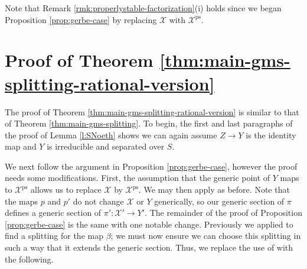 \documentclass{amsart}
\theoremstyle{definition}
\newcommand{\cX}{\mathcal{X}}
\DeclareMathOperator{\ps}{ps}
\begin{document}
	Note that Remark \ref{rmk:properlystable-factorization}(i) holds since we began Proposition \ref{prop:gerbe-case} by replacing $\cX$ with $\cX^{\ps}$.
	
	
	
	\section{Proof of Theorem \ref{thm:main-gms-splitting-rational-version}}
	
	The proof of Theorem \ref{thm:main-gms-splitting-rational-version} is similar to that of Theorem \ref{thm:main-gms-splitting}. To begin, the first and last paragraphs of the proof of Lemma \ref{l:SNoeth} shows we can again assume $Z\to Y$ is the identity map and $Y$ is irreducible and separated over $S$. 
	
	
	We next follow the argument in Proposition \ref{prop:gerbe-case}, however the proof needs some modifications. First, the assumption that the generic point of $Y$ maps to $\cX^{\ps}$ allows us to replace $\cX$ by $\cX^{\ps}$. We may then apply \cite[Theorem 2.11]{ER} as before. Note that the maps $p$ and $p'$ do not change $\cX$ or $Y$ generically, so our generic section of $\pi$ defines a generic section of $\pi'\colon\cX'\to Y'$. The remainder of the proof of Proposition \ref{prop:gerbe-case} is the same with one notable change. Previously we applied \cite[Theorem 2.7]{EHKV} to find a splitting for the map $\beta$; we must now ensure we can choose this splitting in such a way that it extends the generic section. Thus, we replace the use of \cite[Theorem 2.7]{EHKV} with the following.
	
\end{document}
